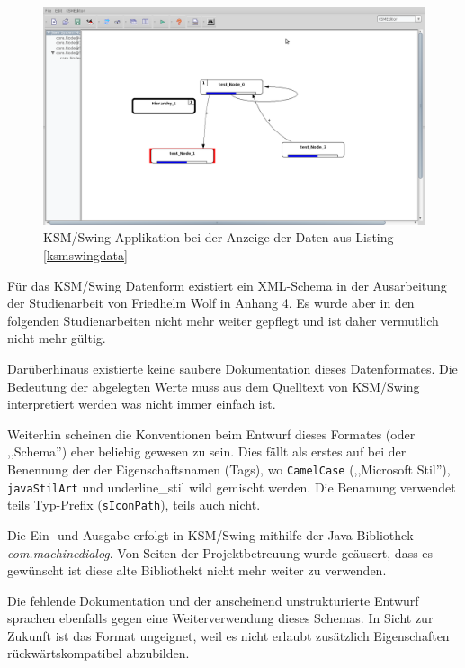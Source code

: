 \documentclass[%
12pt,titlepage,abstracton]{scrreprt}
\begin{document}
\begin{figure}[ht!]
  \centering
  \includegraphics[width=\textwidth]{images/ksm-swing-screenshot.png}
  \caption{KSM/Swing Applikation bei der Anzeige der Daten aus Listing
  \ref{ksmswingdata}}
  \label{fig:ksmswing-diagramm}
\end{figure}

\label{ksmswingdata}

Für das KSM/Swing Datenform existiert ein XML-Schema in der Ausarbeitung der
Studienarbeit von Friedhelm Wolf \cite{wolf05} in Anhang 4. Es wurde aber in den
folgenden Studienarbeiten nicht mehr weiter gepflegt und ist daher vermutlich
nicht mehr gültig.

Darüberhinaus existierte keine saubere Dokumentation dieses Datenformates. Die
Bedeutung der abgelegten Werte muss aus dem Quelltext von KSM/Swing
interpretiert werden was nicht immer einfach ist.

Weiterhin scheinen die Konventionen beim Entwurf dieses Formates (oder
,,Schema'') eher beliebig gewesen zu sein.
Dies fällt als erstes auf bei der Benennung der der Eigenschaftsnamen (Tags), wo
\texttt{CamelCase} (,,Microsoft Stil''), \texttt{javaStilArt} und
underline\_stil wild gemischt werden. Die Benamung verwendet teils Typ-Prefix
(\texttt{sIconPath}), teils auch nicht.

Die Ein- und Ausgabe erfolgt in KSM/Swing mithilfe der Java-Bibliothek
\textit{com.machinedialog}. Von Seiten der Projektbetreuung wurde geäusert, dass
es gewünscht ist diese alte Bibliothekt nicht mehr weiter zu verwenden.


Die fehlende Dokumentation und der anscheinend unstrukturierte Entwurf sprachen
ebenfalls gegen eine Weiterverwendung dieses Schemas.
In Sicht zur Zukunft ist das Format ungeignet, weil es nicht erlaubt zusätzlich
Eigenschaften rückwärtskompatibel abzubilden.
\end{document}
